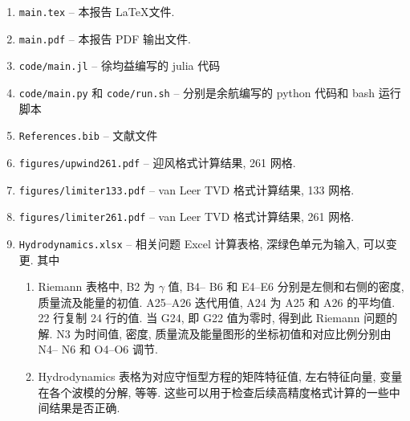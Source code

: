 \documentclass[10.5pt
]{article}
\begin{document}
\begin{enumerate}

\item
\verb|main.tex|
-- 本报告 \LaTeX  文件.
\item
\verb|main.pdf|
-- 本报告 PDF 输出文件.
\item
\verb|code/main.jl|
--  徐均益编写的 julia 代码
\item
\verb|code/main.py| 和 
\verb|code/run.sh|
--  分别是余航编写的 python 代码和 bash 运行脚本
\item
\verb|References.bib|
--  文献文件
\item
\verb|figures/upwind261.pdf|
-- 迎风格式计算结果, 261 网格.
\item
\verb|figures/limiter133.pdf|
-- van Leer TVD 格式计算结果, 133 网格.
\item
\verb|figures/limiter261.pdf|
-- van Leer TVD 格式计算结果, 261 网格.
\item
\verb|Hydrodynamics.xlsx|
-- 相关问题 Excel 计算表格, 深绿色单元为输入, 可以变更. 其中

\begin{enumerate}
\item
  Riemann 表格中, B2 为 $\gamma$ 值, B4-- B6 和 E4--E6 分别是左侧和右侧的密度, 质量流及能量的初值. A25--A26 迭代用值, A24 为 A25 和 A26 的平均值.
  22 行复制 24 行的值. 当 G24, 即 G22 值为零时, 得到此 Riemann 问题的解. N3 为时间值, 密度, 质量流及能量图形的坐标初值和对应比例分别由 N4-- N6 和 O4--O6 调节.
\item
Hydrodynamics 表格为对应守恒型方程的矩阵特征值, 左右特征向量, 变量在各个波模的分解, 等等. 这些可以用于检查后续高精度格式计算的一些中间结果是否正确.
\end{enumerate}
\end{enumerate}



\end{document}
